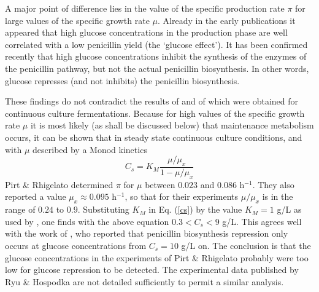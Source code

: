 \documentclass[ejs]{imsart}
\numberwithin{equation}{section}
\theoremstyle{plain}
\theoremstyle{definition}
\theoremstyle{remark}
\begin{document}
A major
point of difference lies in the value of the specific production rate $\pi$ for
large values of the specific growth rate $\mu$.
Already in the early publications \cite{r1,r2,r3}
it appeared that high glucose
concentrations in the production phase are well correlated with a
low penicillin yield (the
`glucose effect'). It has been confirmed recently
\cite{r1,r2,r3,r4}
that
high glucose concentrations inhibit the synthesis of the enzymes of the
penicillin pathway, but not the actual penicillin biosynthesis.
In other words, glucose represses (and not inhibits) the penicillin
biosynthesis.

These findings do not contradict the results of
\cite{r1}  and of \cite{r4} which were obtained for
continuous culture fermentations.
Because for high values of the specific
growth rate $\mu$ it is most likely (as shall be discussed below) that
maintenance metabolism occurs, it can be shown that
in steady state continuous culture conditions, and with $\mu$ described by a Monod kinetics
\begin{equation}
    C_{s}  =  K_{M} \frac{\mu/\mu_{x}}{1-\mu/\mu_{x}} \label{cs}
\end{equation}
Pirt \& Rhigelato determined $\pi$ for $\mu$ between
$0.023$ and $0.086$ h$^{-1}$.
They also reported a value $\mu_{x} \approx 0.095$
h$^{-1}$, so that for their experiments $\mu/\mu_{x}$ is in the range
of $0.24$ to $0.9$.
Substituting $K _M$ in Eq. (\ref{cs}) by
the value $K_{M}=1$ g/L as used by \cite{r1}, one finds
with the above equation $0.3 < C_{s} < 9$ g/L. This agrees well with
the work of  \cite{r4}, who reported that penicillin biosynthesis
repression only occurs at glucose concentrations from $C_{s}=10$ g/L on.
The conclusion is that the glucose concentrations in the experiments of
Pirt \& Rhigelato probably were too low for glucose repression to be
detected. The experimental data published by Ryu \& Hospodka
are not detailed sufficiently to permit a similar analysis.
\end{document}
